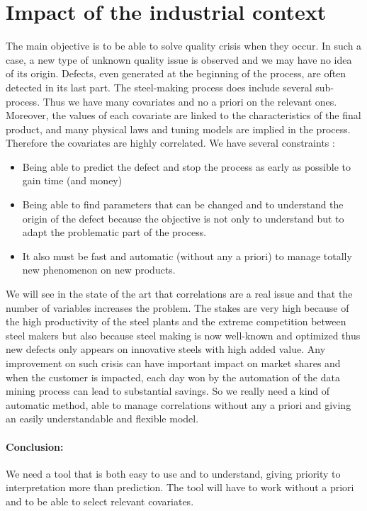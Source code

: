 \documentclass[12pt,a4paper]{report}
\begin{document}
	\section{Impact of the industrial context}
	 The main objective is to be able to solve quality crisis when they occur. In such a case, a new type of unknown quality issue is observed and we may have no idea of its origin. Defects, even generated at the beginning of the process, are often detected in its last part. The steel-making process does include several sub-process. Thus we have many covariates and no a priori on the relevant ones. Moreover, the values of each covariate are linked to the characteristics of the final product, and many physical laws and tuning models are implied in the process. Therefore the covariates are highly correlated.
	We have several constraints :
	\begin{itemize}
		\item Being able to predict the defect and stop the process as early as possible to gain time (and money)
		\item Being able to find parameters that can be changed and to understand the origin of the defect because the objective is not only to understand but to adapt the problematic part of the process.
		\item It also must be fast and automatic (without any a priori) to manage totally new phenomenon on new products.
	\end{itemize}
	We will see in the state of the art that correlations are a real issue and that the number of variables increases the problem.	
	The stakes are very high because of the high productivity of the steel plants and the extreme competition between steel makers but also because steel making is now well-known and optimized thus new defects only appears on innovative steels with high added value. Any improvement on such crisis can have important impact on market shares and when the customer is impacted, each day won by the automation of the data mining process can lead to substantial savings. So we really need a kind of automatic method, able to manage correlations without any a priori and giving an easily understandable and flexible model.

\paragraph{Conclusion:} We need a tool that is both easy to use and to understand, giving priority to interpretation more than prediction. The tool will have to work without a priori and to be able to select relevant covariates.
	
\end{document}

